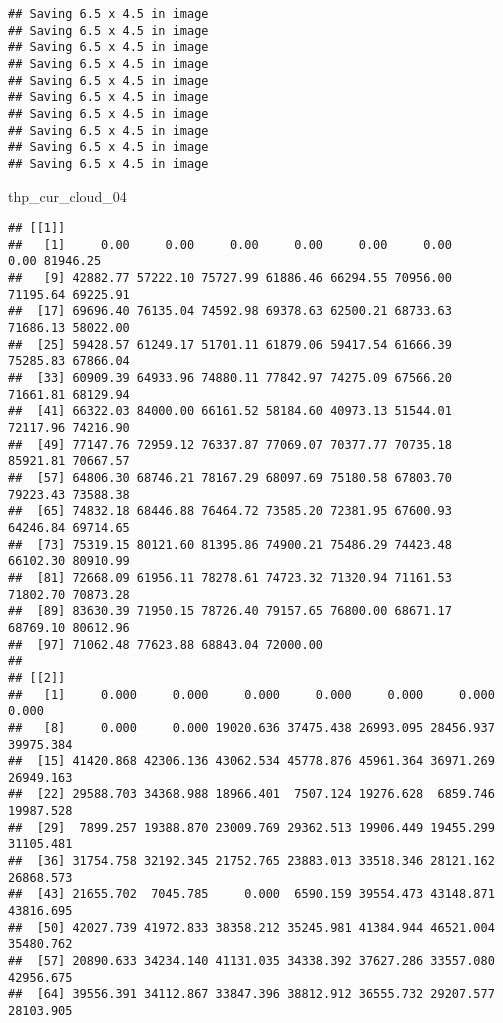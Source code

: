 \documentclass[
]{article}
\newenvironment{Shaded}{\begin{snugshade}}{\end{snugshade}}
\newcommand{\NormalTok}[1]{#1}
\begin{document}
\begin{verbatim}
## Saving 6.5 x 4.5 in image
## Saving 6.5 x 4.5 in image
## Saving 6.5 x 4.5 in image
## Saving 6.5 x 4.5 in image
## Saving 6.5 x 4.5 in image
## Saving 6.5 x 4.5 in image
## Saving 6.5 x 4.5 in image
## Saving 6.5 x 4.5 in image
## Saving 6.5 x 4.5 in image
## Saving 6.5 x 4.5 in image
\end{verbatim}

\begin{Shaded}
\begin{Highlighting}[]
\NormalTok{thp\_cur\_cloud\_04}
\end{Highlighting}
\end{Shaded}

\begin{verbatim}
## [[1]]
##   [1]     0.00     0.00     0.00     0.00     0.00     0.00     0.00 81946.25
##   [9] 42882.77 57222.10 75727.99 61886.46 66294.55 70956.00 71195.64 69225.91
##  [17] 69696.40 76135.04 74592.98 69378.63 62500.21 68733.63 71686.13 58022.00
##  [25] 59428.57 61249.17 51701.11 61879.06 59417.54 61666.39 75285.83 67866.04
##  [33] 60909.39 64933.96 74880.11 77842.97 74275.09 67566.20 71661.81 68129.94
##  [41] 66322.03 84000.00 66161.52 58184.60 40973.13 51544.01 72117.96 74216.90
##  [49] 77147.76 72959.12 76337.87 77069.07 70377.77 70735.18 85921.81 70667.57
##  [57] 64806.30 68746.21 78167.29 68097.69 75180.58 67803.70 79223.43 73588.38
##  [65] 74832.18 68446.88 76464.72 73585.20 72381.95 67600.93 64246.84 69714.65
##  [73] 75319.15 80121.60 81395.86 74900.21 75486.29 74423.48 66102.30 80910.99
##  [81] 72668.09 61956.11 78278.61 74723.32 71320.94 71161.53 71802.70 70873.28
##  [89] 83630.39 71950.15 78726.40 79157.65 76800.00 68671.17 68769.10 80612.96
##  [97] 71062.48 77623.88 68843.04 72000.00
## 
## [[2]]
##   [1]     0.000     0.000     0.000     0.000     0.000     0.000     0.000
##   [8]     0.000     0.000 19020.636 37475.438 26993.095 28456.937 39975.384
##  [15] 41420.868 42306.136 43062.534 45778.876 45961.364 36971.269 26949.163
##  [22] 29588.703 34368.988 18966.401  7507.124 19276.628  6859.746 19987.528
##  [29]  7899.257 19388.870 23009.769 29362.513 19906.449 19455.299 31105.481
##  [36] 31754.758 32192.345 21752.765 23883.013 33518.346 28121.162 26868.573
##  [43] 21655.702  7045.785     0.000  6590.159 39554.473 43148.871 43816.695
##  [50] 42027.739 41972.833 38358.212 35245.981 41384.944 46521.004 35480.762
##  [57] 20890.633 34234.140 41131.035 34338.392 37627.286 33557.080 42956.675
##  [64] 39556.391 34112.867 33847.396 38812.912 36555.732 29207.577 28103.905

\end{verbatim}
\end{document}
